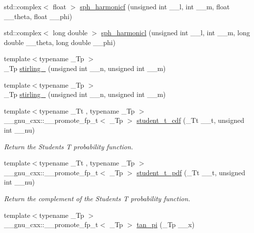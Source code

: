 \begin{DoxyCompactItemize}
\item 
std\+::complex$<$ float $>$ \hyperlink{group__gnu__math__spec__func_ga062b1156f5646fe42719439bb3dcc9e5}{sph\+\_\+harmonicf} (unsigned int \+\_\+\+\_\+l, int \+\_\+\+\_\+m, float \+\_\+\+\_\+theta, float \+\_\+\+\_\+phi)
\item 
std\+::complex$<$ long double $>$ \hyperlink{group__gnu__math__spec__func_ga414c8374b4579aa14e38f5401304b6fa}{sph\+\_\+harmonicl} (unsigned int \+\_\+\+\_\+l, int \+\_\+\+\_\+m, long double \+\_\+\+\_\+theta, long double \+\_\+\+\_\+phi)
\item 
{\footnotesize template$<$typename \+\_\+\+Tp $>$ }\\\+\_\+\+Tp \hyperlink{group__gnu__math__spec__func_ga2b955dac7d2c5125f2091eaeb25c8ad2}{stirling\+\_} (unsigned int \+\_\+\+\_\+n, unsigned int \+\_\+\+\_\+m)
\item 
{\footnotesize template$<$typename \+\_\+\+Tp $>$ }\\\+\_\+\+Tp \hyperlink{group__gnu__math__spec__func_ga3761c0e467cbe45cbda66a4e796adcd3}{stirling\+\_} (unsigned int \+\_\+\+\_\+n, unsigned int \+\_\+\+\_\+m)
\item 
{\footnotesize template$<$typename \+\_\+\+Tt , typename \+\_\+\+Tp $>$ }\\\+\_\+\+\_\+gnu\+\_\+cxx\+::\+\_\+\+\_\+promote\+\_\+fp\+\_\+t$<$ \+\_\+\+Tp $>$ \hyperlink{group__gnu__math__spec__func_ga9762f044477668e7138f72569ef50a89}{student\+\_\+t\+\_\+cdf} (\+\_\+\+Tt \+\_\+\+\_\+t, unsigned int \+\_\+\+\_\+nu)
\begin{DoxyCompactList}\small\item\em Return the Students T probability function. \end{DoxyCompactList}\item 
{\footnotesize template$<$typename \+\_\+\+Tt , typename \+\_\+\+Tp $>$ }\\\+\_\+\+\_\+gnu\+\_\+cxx\+::\+\_\+\+\_\+promote\+\_\+fp\+\_\+t$<$ \+\_\+\+Tp $>$ \hyperlink{group__gnu__math__spec__func_ga74de88458ea2ed12e92a1520c7cad08e}{student\+\_\+t\+\_\+pdf} (\+\_\+\+Tt \+\_\+\+\_\+t, unsigned int \+\_\+\+\_\+nu)
\begin{DoxyCompactList}\small\item\em Return the complement of the Students T probability function. \end{DoxyCompactList}\item 
{\footnotesize template$<$typename \+\_\+\+Tp $>$ }\\\+\_\+\+\_\+gnu\+\_\+cxx\+::\+\_\+\+\_\+promote\+\_\+fp\+\_\+t$<$ \+\_\+\+Tp $>$ \hyperlink{group__gnu__math__spec__func_ga5029c1e804c1c9b28949b5ef00237c08}{tan\+\_\+pi} (\+\_\+\+Tp \+\_\+\+\_\+x)

\end{DoxyCompactItemize}
